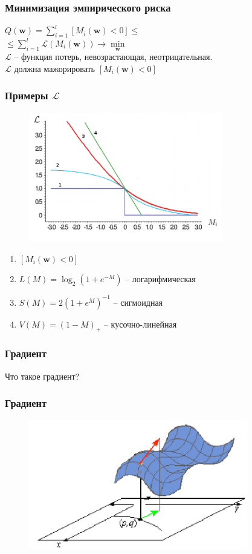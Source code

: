 \documentclass[12pt]{beamer}
\begin{document}
\begin{frame}\frametitle{Минимизация эмпирического риска}
${Q(\mathbf{w}) = \sum\limits_{i=1}^l \left[ M_i(\mathbf{w}) < 0 \right] \leq}$\\ \vspace{3mm}
\hspace{10mm} ${\leq \sum\limits_{i=1}^l \mathcal{L}(M_i(\mathbf{w})) \rightarrow \min\limits_{\mathbf{w}} }$\\\vspace{3mm}
$\mathcal{L}$ -- функция потерь, невозрастающая, неотрицательная.\\ 
$\mathcal{L}$ должна мажорировать $\left[M_i(\mathbf{w}) < 0 \right]$
\end{frame}

\begin{frame}\frametitle{Примеры $\mathcal{L}$}
\begin{figure}[htbp]
  \includegraphics[height=160pt, keepaspectratio = true]{images/l}   
\end{figure}
\begin{enumerate}
\item $\left[M_i(\mathbf{w}) < 0 \right]$
\item $L(M) = \log_2(1+e^{-M})$ -- логарифмическая
\item $S(M) = 2(1+e^M)^{-1}$ -- сигмоидная
\item $V(M) = (1-M)_+$ -- кусочно-линейная
\end{enumerate}
\end{frame}

\begin{frame}\frametitle{Градиент}
Что такое градиент?
\end{frame}

\begin{frame}\frametitle{Градиент}
\begin{figure}[htbp]
  \includegraphics[height=160pt, keepaspectratio = true]{images/gradient}   
\end{figure}
\end{frame}
\end{document}
